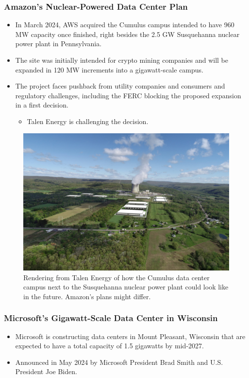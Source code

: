 \documentclass[aspectratio=169]{beamer}
\begin{document}
    \begin{frame}
        \frametitle{Amazon's Nuclear-Powered Data Center Plan}
        \begin{itemize}
            \item In March 2024, AWS acquired the Cumulus campus intended to have 960 MW capacity once finished, right besides the 2.5 GW Susquehanna nuclear power plant in Pennsylvania.
            \item The site was initially intended for crypto mining companies and will be expanded in 120 MW increments into a gigawatt-scale campus.
            \item The project faces pushback from utility companies and consumers and regulatory challenges, including the FERC blocking the proposed expansion in a first decision.
            \begin{itemize}
                \item Talen Energy is challenging the decision.~\parencite{data_center_dynamics_susquehanna_2025}
            \end{itemize}
        \end{itemize}
    \end{frame}
    \begin{frame}
        \begin{figure}
            \includegraphics[height=0.5\textwidth]{images/cumulus-campus-rendering}
            \caption{Rendering from Talen Energy of how the Cumulus data center campus next to the Susquehanna nuclear power plant could look like in the future. Amazon's plans might differ.}
        \end{figure}
    \end{frame}
    \begin{frame}
        \frametitle{Microsoft's Gigawatt-Scale Data Center in Wisconsin}
        \begin{itemize}
            \item Microsoft is constructing data centers in Mount Pleasant, Wisconsin that are expected to have a total capacity of 1.5 gigawatts by mid-2027.~\parencite{patel_stanford_lecture_2024}
            \item Announced in May 2024 by Microsoft President Brad Smith and U.S. President Joe Biden.~\parencite{microsoft_wisconsin_2024}
        \end{itemize}
    \end{frame}
\end{document}
